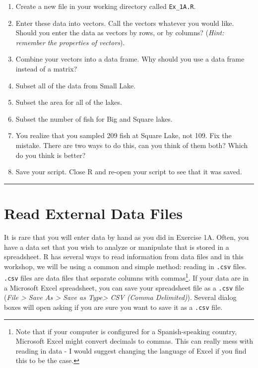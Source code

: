 \documentclass[]{book}
\providecommand{\tightlist}{%
  \setlength{\itemsep}{0pt}\setlength{\parskip}{0pt}}
\let\rmarkdownfootnote\footnote%
\def\footnote{\protect\rmarkdownfootnote}
\theoremstyle{definition}
\theoremstyle{definition}
\theoremstyle{definition}
\theoremstyle{remark}
\begin{document}
\begin{enumerate}
\def\labelenumi{\arabic{enumi}.}
\tightlist
\item
  Create a new file in your working directory called \texttt{Ex\_1A.R}.
\item
  Enter these data into vectors. Call the vectors whatever you would
  like. Should you enter the data as vectors by rows, or by columns?
  (\emph{Hint: remember the properties of vectors}).
\item
  Combine your vectors into a data frame. Why should you use a data
  frame instead of a matrix?
\item
  Subset all of the data from Small Lake.
\item
  Subset the area for all of the lakes.
\item
  Subset the number of fish for Big and Square lakes.
\item
  You realize that you sampled 209 fish at Square Lake, not 109. Fix the
  mistake. There are two ways to do this, can you think of them both?
  Which do you think is better?
\item
  Save your script. Close R and re-open your script to see that it was
  saved.
\end{enumerate}

\begin{center}\rule{0.5\linewidth}{\linethickness}\end{center}

\section{Read External Data Files}\label{read}

It is rare that you will enter data by hand as you did in Exercise 1A.
Often, you have a data set that you wish to analyze or manipulate that
is stored in a spreadsheet. R has several ways to read information from
data files and in this workshop, we will be using a common and simple
method: reading in \texttt{.csv} files. \texttt{.csv} files are data
files that separate columns with commas\footnote{Note that if your
  computer is configured for a Spanish-speaking country, Microsoft Excel
  might convert decimals to commas. This can really mess with reading in
  data - I would suggest changing the language of Excel if you find this
  to be the case.}. If your data are in a Microsoft Excel spreadsheet,
you can save your spreadsheet file as a \texttt{.csv} file (\emph{File
\textgreater{} Save As \textgreater{} Save as Type\textgreater{} CSV
(Comma Delimited)}). Several dialog boxes will open asking if you are
sure you want to save it as a \texttt{.csv} file.
\end{document}
